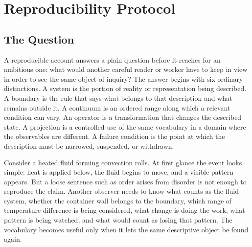 \documentclass[11pt,a4paper,openany]{book}
\begin{document}
\section{Reproducibility Protocol}
\subsection{The Question}
A reproducible account answers a plain question before it reaches for an ambitious one: what would another careful reader or worker have to keep in view in order to see the same object of inquiry? The answer begins with six ordinary distinctions. A system is the portion of reality or representation being described. A boundary is the rule that says what belongs to that description and what remains outside it. A continuum is an ordered range along which a relevant condition can vary. An operator is a transformation that changes the described state. A projection is a controlled use of the same vocabulary in a domain where the observables are different. A failure condition is the point at which the description must be narrowed, suspended, or withdrawn. \cite{prigogine_dissipative,haken_synergetics}\par
Consider a heated fluid forming convection rolls. At first glance the event looks simple: heat is applied below, the fluid begins to move, and a visible pattern appears. But a loose sentence such as order arises from disorder is not enough to reproduce the claim. Another observer needs to know what counts as the fluid system, whether the container wall belongs to the boundary, which range of temperature difference is being considered, what change is doing the work, what pattern is being watched, and what would count as losing that pattern. The vocabulary becomes useful only when it lets the same descriptive object be found again.\par
\end{document}
